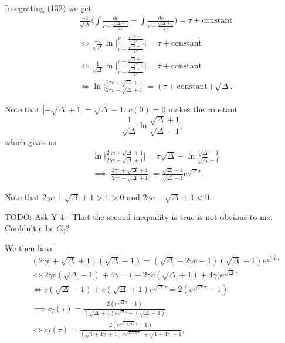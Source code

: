 \documentclass[12pt]{article}
\begin{document}
Integrating (132) we get
\begin{align}
&\frac{-1}{\sqrt{\Delta}}
\Big( \int \frac{dc}{c - \frac{\sqrt{\Delta} - 1}{2 \gamma}} -
      \int \frac{dc}{c + \frac{\sqrt{\Delta} + 1}{2 \gamma}}
\Big) = \tau + \text{constant} \\
&\iff \frac{-1}{\sqrt{\Delta}}
      \ln \bigg|\frac{c - \frac{\sqrt{\Delta}-1}{2\gamma}}
                     {c + \frac{\sqrt{\Delta}+1}{2\gamma}} \bigg|
 = \tau + \text{constant} \\
&\iff \frac{1}{\sqrt{\Delta}}
      \ln \bigg|\frac{c + \frac{\sqrt{\Delta}+1}{2\gamma}}
                     {c - \frac{\sqrt{\Delta}-1}{2\gamma}} \bigg|
 = \tau + \text{constant} \\
&\iff  \ln \bigg|\frac{2\gamma c + \sqrt{\Delta}+1}
                      {2\gamma c - \sqrt{\Delta}+1} \bigg|
 = (\tau + \text{constant}) \sqrt{\Delta}.
\end{align}

Note that $|-\sqrt{\Delta}+1| = \sqrt{\Delta} - 1$. $c(0)=0$ makes the constant
\begin{equation}
\frac{1}{\sqrt{\Delta}} \ln \frac{\sqrt{\Delta}+1}{{\sqrt{\Delta}-1}},
\end{equation}
which gives us
\begin{align}
&\ln \bigg|\frac{2\gamma c + \sqrt{\Delta}+1}
                {2\gamma c - \sqrt{\Delta}+1} \bigg|
 = \tau \sqrt{\Delta} + \ln \frac{\sqrt{\Delta}+1}{{\sqrt{\Delta}-1}}\\
&\implies \bigg|\frac{2\gamma c + \sqrt{\Delta}+1}
                     {2\gamma c - \sqrt{\Delta}+1} \bigg|
 = \frac{\sqrt{\Delta}+1}{{\sqrt{\Delta}-1}} \mathrm{e}^{\sqrt{\Delta} \tau}.
\end{align}

Note that $2 \gamma c + \sqrt{\Delta} + 1 > 1 > 0$ and
$2 \gamma c - \sqrt{\Delta} + 1 < 0$.

TODO: Ask Y 4 - That the second inequality is true is not obvious to
me. Couldn't c be $C_0$?

We then have:
\begin{align}
&(2\gamma c + \sqrt{\Delta} + 1)(\sqrt{\Delta} - 1) =
   (\sqrt{\Delta} - 2\gamma c - 1)(\sqrt{\Delta} + 1) e^{\sqrt{\Delta} \tau} \\
&\iff 2\gamma c (\sqrt{\Delta} - 1) + 4 \gamma =
  \Big( -2\gamma c(\sqrt{\Delta} + 1) + 4\gamma \Big) e^{\sqrt{\Delta} \tau} \\
&\iff c (\sqrt{\Delta} - 1) + c (\sqrt{\Delta} + 1) e^{\sqrt{\Delta} \tau} =
   2(e^{\sqrt{\Delta} \tau} - 1) \\
&\implies c_I(\tau) =
  \frac{2(e^{\sqrt{\Delta} \tau} - 1)}
       {  (\sqrt{\Delta} + 1) e^{\sqrt{\Delta} \tau} + (\sqrt{\Delta} - 1)} \\
&\iff c_I(\tau) =
  \frac{2(e^{\sqrt{1+4\gamma} \tau} - 1)}
       {(\sqrt{1+4\gamma} + 1) e^{\sqrt{1+4\gamma} \tau} + \sqrt{1+4\gamma} - 1},
\end{align}
\end{document}
